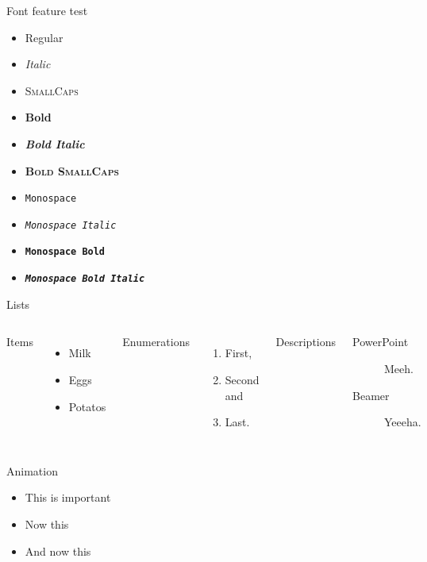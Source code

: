 \documentclass[10pt, fleqn, dvipsnames]{beamer}
\begin{document}
\begin{frame}{Font feature test}
  \begin{itemize}
    \item Regular
    \item \textit{Italic}
    \item \textsc{SmallCaps}
    \item \textbf{Bold}
    \item \textbf{\textit{Bold Italic}}
    \item \textbf{\textsc{Bold SmallCaps}}
    \item \texttt{Monospace}
    \item \texttt{\textit{Monospace Italic}}
    \item \texttt{\textbf{Monospace Bold}}
    \item \texttt{\textbf{\textit{Monospace Bold Italic}}}
  \end{itemize}
\end{frame}


\begin{frame}{Lists}
  \begin{columns}[T,onlytextwidth]
      Items
      \begin{itemize}
        \item Milk \item Eggs \item Potatos
      \end{itemize}

      Enumerations
      \begin{enumerate}
        \item First, \item Second and \item Last.
      \end{enumerate}

      Descriptions
      \begin{description}
        \item[PowerPoint] Meeh. \item[Beamer] Yeeeha.
      \end{description}
  \end{columns}
\end{frame}


\begin{frame}{Animation}
  \begin{itemize}[<+- | alert@+>]
    \item \alert<4>{This is important}
    \item Now this
    \item And now this
  \end{itemize}
\end{frame}
\end{document}
